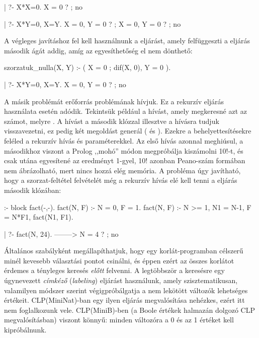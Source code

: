 \begin{prologcode}
| ?- {X*X=0}.
X = 0 ? ; no

| ?- {X*Y=0}, X=Y.
X = 0, Y = 0 ? ;
X = 0, Y = 0 ? ; no
\end{prologcode}

A végleges javításhoz fel kell használnunk a  eljárást, amely
felfüggeszti a  eljárás második ágát addig, amíg
az egyesíthetőség el nem dönthető:

\begin{prologcode}
szorzatuk_nulla(X, Y) :-
        (   X = 0 
        ;   dif(X, 0), Y = 0
        ).

| ?- {X*Y=0}, X=Y.
X = 0, Y = 0 ? ; no
\end{prologcode}

A másik problémát erőforrás problémának hívjuk. Ez a rekurzív 
eljárás használata esetén adódik. Tekintsük például a  hívást,
amely megkeresné azt az  számot, melyre . A hívást a második
 klózzal illesztve a  hívásra tudjuk visszavezetni, ez
pedig két megoldást generál ( és ). Ezekre
a behelyettesítésekre feléled a rekurzív  hívás  és
 paraméterekkel. Az első hívás azonnal meghiúsul, a másodikhoz
viszont a Prolog ,,mohó'' módon megpróbálja kiszámolni 10!-t, és csak utána
egyesítené az eredményt 1-gyel, 10! azonban Peano-szám formában nem
ábrázolható, mert nincs hozzá elég memória. A probléma úgy javítható, hogy
a szorzat-feltétel felvételét még a rekurzív hívás elé kell tenni a 
eljárás második klózában:

\begin{prologcode}
:- block fact(-,-).
fact(N, F) :- {N = 0, F = 1}.
fact(N, F) :-
        {N >= 1, N1 = N-1, F = N*F1},
        fact(N1, F1).

| ?- fact(N, 24).    -------->   N = 4 ? ; no
\end{prologcode}

Általános szabályként megállapíthatjuk, hogy egy korlát-programban célszerű
minél kevesebb választási pontot csinálni, és éppen ezért az összes korlátot
érdemes a tényleges keresés \emph{előtt} felvenni. A legtöbbször a keresésre
egy úgynevezett \emph{címkéző} (\emph{labeling}) eljárást használunk, amely
szisztematikusan, valamilyen módszer szerint végigpróbálgatja a nem lekötött
változók lehetséges értékeit. CLP(MiniNat)-ban egy ilyen eljárás megvalósítása
nehézkes, ezért itt nem foglalkozunk vele. CLP(MiniB)-ben (a Boole értékek
halmazán dolgozó CLP megvalósításban) viszont könnyű: minden változóra a
0 és az 1 értéket kell kipróbálnunk.
